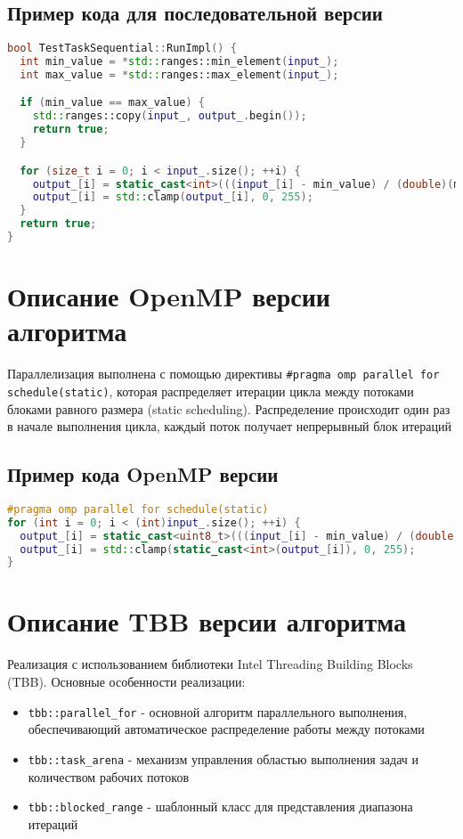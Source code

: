 \documentclass[14pt,a4paper]{extarticle}
\begin{document}
\subsection*{Пример кода для последовательной версии}
\begin{lstlisting}[language=C++]
bool TestTaskSequential::RunImpl() {
  int min_value = *std::ranges::min_element(input_);
  int max_value = *std::ranges::max_element(input_);

  if (min_value == max_value) {
    std::ranges::copy(input_, output_.begin());
    return true;
  }

  for (size_t i = 0; i < input_.size(); ++i) {
    output_[i] = static_cast<int>(((input_[i] - min_value) / (double)(max_value - min_value)) * 255);
    output_[i] = std::clamp(output_[i], 0, 255);
  }
  return true;
}
\end{lstlisting}

\section{Описание OpenMP версии алгоритма}

Параллелизация выполнена с помощью директивы \texttt{\#pragma omp parallel for schedule(static)}, которая распределяет итерации цикла между потоками блоками равного размера (static scheduling). Распределение происходит один раз в начале выполнения цикла, каждый поток получает непрерывный блок итераций

\subsection*{Пример кода OpenMP версии}
\begin{lstlisting}[language=C++]
#pragma omp parallel for schedule(static)
for (int i = 0; i < (int)input_.size(); ++i) {
  output_[i] = static_cast<uint8_t>(((input_[i] - min_value) / (double)(max_value - min_value)) * 255);
  output_[i] = std::clamp(static_cast<int>(output_[i]), 0, 255);
}
\end{lstlisting}

\section{Описание TBB версии алгоритма}

Реализация с использованием библиотеки Intel Threading Building Blocks (TBB). Основные особенности реализации:

\begin{itemize}
\item \texttt{tbb::parallel\_for} - основной алгоритм параллельного выполнения, обеспечивающий автоматическое распределение работы между потоками
\item \texttt{tbb::task\_arena} - механизм управления областью выполнения задач и количеством рабочих потоков
\item \texttt{tbb::blocked\_range} - шаблонный класс для представления диапазона итераций
\end{itemize}
\end{document}
